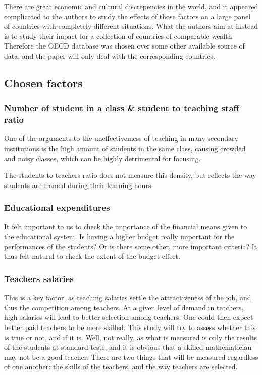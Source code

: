 \documentclass[12pt,a4paper]{article}
\begin{document}
There are great economic and cultural discrepencies in the world, and it appeared complicated to the authors to study the effects of those factors on a large panel of countries with completely different situations. What the authors aim at instead is to study their impact for a collection of countries of comparable wealth.
Therefore the OECD database was chosen over some other available source of data, and the paper will only deal with the corresponding countries.

\subsection{Chosen factors}

\subsubsection{Number of student in a class \& student to teaching staff ratio}

One of the arguments to the uneffectivemess of teaching in many secondary institutions is the high amount of students in the same class, causing crowded and noisy classes, which can be highly detrimental for focusing.

The students to teachers ratio does not measure this density, but reflects the way students are framed during their learning hours.

\subsubsection{Educational expenditures}

It felt important to us to check the importance of the financial means given to the educational system. Is having a higher budget really important for the performances of the students? Or is there some other, more important criteria? It thus felt natural to check the extent of the budget effect. 

\subsubsection{Teachers salaries}

This is a key factor, as teaching salaries settle the attractiveness of the job, and thus the competition among teachers. At a given level of demand in teachers, high salaries will lead to better selection among teachers. One could then expect better paid teachers to be more skilled. This study will try to assess whether this is true or not, and if it is. Well, not really, as what is measured is only the results of the students at standard tests, and it is obvious that a skilled mathematician may not be a good teacher. There are two things that will be measured regardless of one another: the skills of the teachers, and the way teachers are selected.
\end{document}
